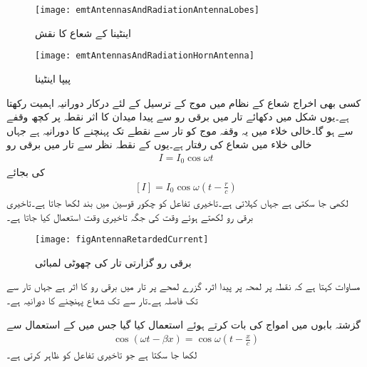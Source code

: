 
\begin{figure}
\centering
\texttt{[image: emtAntennasAndRadiationAntennaLobes]}
\caption{اینٹینا کے شعاع کا نقش}
\label{شکل_اینٹینا_شعاع_نقش}
\end{figure}

\begin{figure}
\centering
\texttt{[image: emtAntennasAndRadiationHornAntenna]}
\caption{پیپا اینٹینا}
\label{شکل_اینٹینا_پیپا_اینٹینا}
\end{figure}
کسی بھی اخراج شعاع کے نظام میں موج کے ترسیل کے لئے درکار دورانیہ اہمیت رکھتا ہے۔یوں شکل  میں دکھائے تار میں برقی رو سے پیدا میدان کا اثر نقطہ  پر کچھ وقفے سے ہو گا۔خالی خلاء میں یہ وقفہ موج کو تار سے نقطے تک پہنچنے کا دورانیہ  ہے جہاں
  خالی خلاء میں  شعاع کی رفتار ہے۔یوں  کے نقطہ نظر سے تار میں برقی رو
\begin{align}
I=I_0 \cos \omega t
\end{align} 
کی بجائے
\begin{align}\label{مساوات_اینٹینا_تاخیری_رو}
[I]=I_0 \cos \omega  \left (t-\frac{r}{c} \right)
\end{align} 
لکھی جا سکتی ہے جہاں   کہلاتی ہے۔تاخیری تفاعل کو چکور قوسین میں بند لکھا جاتا ہے۔تاخیری برقی رو لکھتے ہوئے وقت  کی جگہ تاخیری وقت  استعمال کیا جاتا ہے۔

\begin{figure}
\centering
\texttt{[image: figAntennaRetardedCurrent]}
\caption{برقی رو گزارتی تار کی چھوٹی لمبائی}
\label{شکل_اینٹینا_تاخیری_رو}
\end{figure}

مساوات  کہتا ہے کہ نقطہ  پر لمحہ   پر پیدا اثر،  گزرے  لمحے  پر تار میں برقی رو کا اثر ہے جہاں تار سے  تک فاصلہ  ہے۔تار سے  تک شعاع پہنچنے کا دورانیہ  ہے۔

گزشتہ بابوں میں امواج کی بات کرتے ہوئے  استعمال کیا گیا جس میں  کے استعمال سے
\begin{align}
\cos (\omega t -\beta x)=\cos \omega\left( t- \frac{x}{c}\right)
\end{align}
لکھا جا سکتا ہے  جو تاخیری تفاعل کو ظاہر کرتی ہے۔

